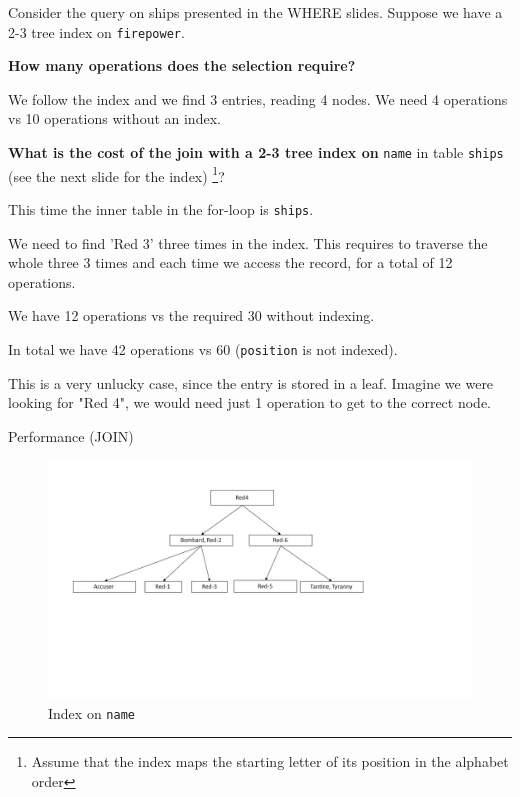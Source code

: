 \documentclass{beamer}
\begin{document}
\begin{slide}{
\item Consider the query on ships presented in the WHERE slides. Suppose we have a 2-3 tree index on \texttt{firepower}.
\item \textbf{How many operations does the selection require?}
\pause
\item We follow the index and we find 3 entries, reading 4 nodes. We need 4 operations vs 10 operations without an index.
}\end{slide}

\begin{slide}{
\item \textbf{What is the cost of the join with a 2-3 tree index on} \texttt{name} in table \texttt{ships} (see the next slide for the index) \footnote{Assume that the index maps the starting letter of its position in the alphabet order}?
\pause
\item This time the inner table in the for-loop is \texttt{ships}.
\item We need to find 'Red 3' three times in the index. This requires to traverse the whole three 3 times and each time we access the record, for a total of 12 operations.
\item We have 12 operations vs the required 30 without indexing.
\item In total we have 42 operations vs 60 (\texttt{position} is not indexed).
\item This is a very unlucky case, since the entry is stored in a leaf. Imagine we were looking for "Red 4", we would need just 1 operation to get to the correct node.
}\end{slide}

\begin{frame}{Performance (JOIN)}
\begin{figure}
\centering
\includegraphics[scale=0.3]{img/tree1}
\caption{Index on \texttt{name}}
\end{figure}
\end{frame}
\end{document}

